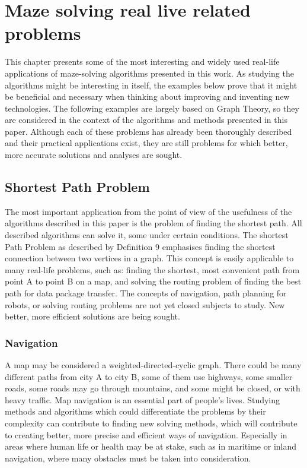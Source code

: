 \chapter{Maze solving real live related problems}\label{cha:background}
This chapter presents some of the most interesting and widely used real-life applications of maze-solving algorithms presented in this work. 
As studying the algorithms might be interesting in itself, the examples below prove that it might be beneficial and necessary when thinking about 
improving and inventing new technologies. The following examples are largely based on Graph Theory, so they are considered in the context of 
the algorithms and methods presented in this paper. Although each of these problems has already been thoroughly described and their practical 
applications exist, they are still problems for which better, more accurate solutions and analyses are sought.
\section{Shortest Path Problem}
The most important application from the point of view of the usefulness of the algorithms described in this paper is the problem of finding the shortest path.
All described algorithms can solve it, some under certain conditions. The shortest Path Problem as described by Definition 9 emphasises
finding the shortest connection between two vertices in a graph. This concept is easily applicable to many real-life problems, such as: finding the shortest, most
convenient path from point A to point B on a map, and solving the routing problem of finding the best path for data package transfer. The concepts of navigation, 
path planning for robots, or solving routing problems are not yet closed subjects to study. New better, more efficient solutions are being sought. 
\subsection{Navigation}
A map may be considered a weighted-directed-cyclic graph. There could be many different paths from city A to city B, some of them use highways, some smaller 
roads, some roads may go through mountains, and some might be closed, or with heavy traffic. Map navigation is an essential part of people's lives. 
Studying methods and algorithms which could differentiate the problems by their complexity can contribute to finding new solving methods, which will contribute 
to creating better, more precise and efficient ways of navigation. Especially in areas where human life or health may be at stake, such as in maritime or inland 
navigation, where many obstacles must be taken into consideration.\cite{19}
